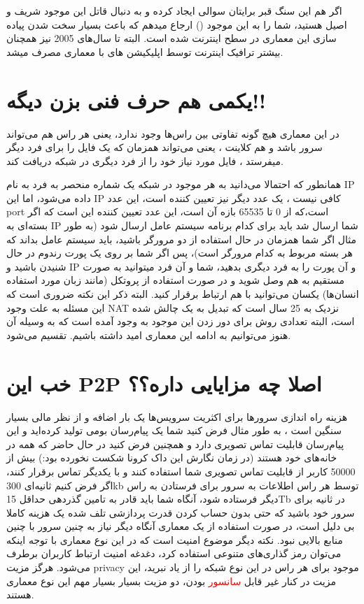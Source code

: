 \documentclass[]{article}
\begin{document}
اگر هم این سنگ قبر برایتان سوالی ایجاد کرده و به دنبال قاتل این موجود شریف و اصیل هستید، شما را به این موجود () ارجاع میدهم که باعث بسیار سخت شدن پیاده سازی این معماری در سطح اینترنت شده است. البته تا سال‌های 2005 نیز همچنان بیشتر ترافیک اینترنت توسط اپلیکیشن های با معماری  مصرف میشد.
 
 
\section*{{\titr یکمی هم حرف فنی بزن دیگه!!}}

در این معماری هیچ گونه تفاوتی بین راس‌ها وجود ندارد، یعنی هر راس هم می‌تواند سرور باشد و هم کلاینت ، یعنی می‌تواند همزمان که یک فایل را برای فرد دیگر میفرستد ، فایل مورد نیاز خود را از فرد دیگری در شبکه دریافت کند.

همانطور که احتمالا می‌دانید به هر موجود در شبکه یک شماره منحصر به فرد به نام IP داده می‌شود، اما این IP کافی نیست ، یک عدد دیگر نیز تعیین کننده است، این عدد port است،که از 0 تا 65535 بازه آن است، این عدد تعیین کننده این است که اگر بسته‌ای به IP شما ارسال شد باید برای کدام برنامه سیستم عامل ارسال شود (به طور مثال اگر شما همزمان در حال استفاده از دو مرورگر باشید، باید سیستم عامل بداند که هر بسته مربوط به کدام مرورگر است)، پس اگر شما بر روی یک پورت رندوم در حال شنیدن باشید و IP و آن پورت را به فرد دیگری بدهید‌، شما و آن فرد میتوانید به صورت مستقیم به هم وصل شوید و در صورت استفاده از پروتکل (مانند زبان مورد استفاده انسان‌ها) یکسان می‌توانید با هم ارتباط برقرار کنید.
البته ذکر این نکته ضروری است که این مسئله به علت وجود NAT نزدیک به 25 سال است که تبدیل به یک چالش شده است، البته تعدادی روش برای دور زدن این موجود  به وجود آمده است که به وسیله آن هنوز می‌توانیم به ادامه این معماری امید داشته باشیم.
   تقسیم می‌شود.


\newpage
\section*{{\titr خب این P2P اصلا چه مزایایی داره؟؟}}


هزینه راه اندازی سرور‌ها برای اکثریت سرویس‌ها یک بار اضافه و از نظر مالی بسیار سنگین است ، به طور مثال فرض کنید شما یک پیام‌رسان بومی تولید کرده‌اید و این پیام‌رسان قابلیت تماس تصویری دارد و همچنین فرض کنید در حال حاضر که همه در خانه‌های خود هستند (در زمان نگارش این داک کرونا شکست نخورده بود:) بیش از 50000 کاربر از قابلیت تماس تصویری شما استفاده کنند و با یکدیگر تماس برقرار کنند، اگر فرض کنیم ثانیه‌ای 300kb توسط هر راس اطلاعات به سرور برای فرستادن به راس دیگر فرستاده شود‌، آنگاه شما باید قادر به تامین گذردهی حداقل 15Tb در ثانیه برای سرور خود باشید که حتی بدون حساب کردن قدرت پردازشی تلف شده یک هزینه کاملا بی دلیل است، در صورت استفاده از یک معماری  آنگاه دیگر نیاز به چنین سرور با چنین منابع بالایی نبود. نکته دیگر موضوع امنیت است که در این نوع معماری با توجه اینکه می‌توان رمز گذاری‌های متنوعی استفاده کرد، دغدغه امنیت ارتباط کاربران برطرف می‌شود. 
هرگز مزیت privacy موجود برای هر راس در این نوع شبکه را از یاد نبرید، این مزیت در کنار غیر قابل \textcolor{red}{سانسور} بودن‌، دو مزیت بسیار بسیار مهم این نوع معماری هستند.
\end{document}
